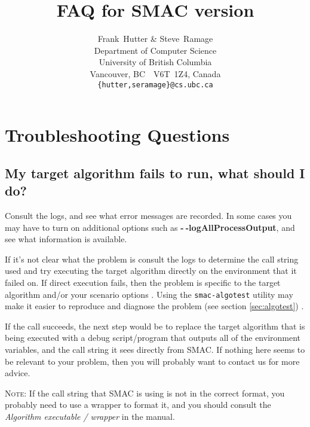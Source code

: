 \documentclass[11pt,letterpaper,oneside]{article}
\begin{document}
\title{FAQ for SMAC version }

\author{
Frank~Hutter \& Steve~Ramage\\
Department of Computer Science\\
University of British Columbia\\
Vancouver, BC\ \ V6T~1Z4, Canada\\
\texttt{\{hutter,seramage\}@cs.ubc.ca}
}



\maketitle


\renewcommand*\contentsname{FAQ}
\tableofcontents

\section{Troubleshooting Questions}


\subsection{My target algorithm fails to run, what should I do?}

Consult the logs, and see what error messages are recorded. In some cases you may have to turn on additional options such as \textbf{-$~\!$-logAllProcessOutput}, and see what information is available.

If it's not clear what the problem is consult the logs to determine the call string used and try executing the target algorithm directly on the environment that it failed on. If direct execution fails, then the problem is specific to the target algorithm and/or your scenario options . Using the \texttt{smac-algotest} utility may make it easier to reproduce and diagnose the problem (see section \ref{sec:algotest}) .

If the call succeeds, the next step would be to replace the target algorithm that is being executed with a debug script/program that outputs all of the environment variables, and the call string it sees directly from SMAC. If nothing here seems to be relevant to your problem, then you will probably want to contact us for more advice.

\textsc{Note:} If the call string that SMAC is using is not in the correct format, you probably need to use a wrapper to format it, and you should consult the \emph{Algorithm executable / wrapper} in the manual.
\end{document}
